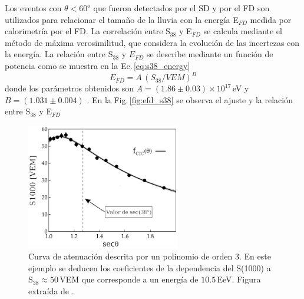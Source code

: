 Los eventos con $\theta<60^o$  que fueron detectados por el SD y por el FD son utilizados para relacionar el tamaño de la lluvia con la energía  E$_{FD}$ medida por calorimetría por el FD.  La correlación entre S$_{38}$ y E$_{FD}$ se calcula mediante el método de máxima verosimilitud, que considera la evolución de las incertezas con la energía. La relación entre S$_{38}$ y $E_{FD}$ se describe mediante un función de potencia como se muestra en la Ec.\,\ref{eq:s38_energy}
\begin{equation}
	E_{FD}= A\, (S_{38}/VEM)^B
	\label{eq:s38_energy}
\end{equation}
donde los parámetros obtenidos son $A=(1.86\pm0.03)\times 10^{17}\,$eV y $B=(1.031\pm0.004)$  \cite{tobepublished}. En la Fig.\,\ref{fig:efd_s38} se observa el ajuste y la relación entre  S$_{38}$ y E$_{FD}$



\begin{figure}[H]
	\centering
	\includegraphics[width=0.6\textwidth]{s1000_theta.png}
	\caption{Curva de atenuación descrita por un polinomio de orden 3. En este ejemplo se deducen los coeficientes de la dependencia del S(1000) a S$_{38}\approx 50\,$VEM que corresponde a un energía de $10.5\,$EeV. Figura extraída de \cite{como_funciona_auger}.} 	\label{fig:s1000_theta}
\end{figure}

